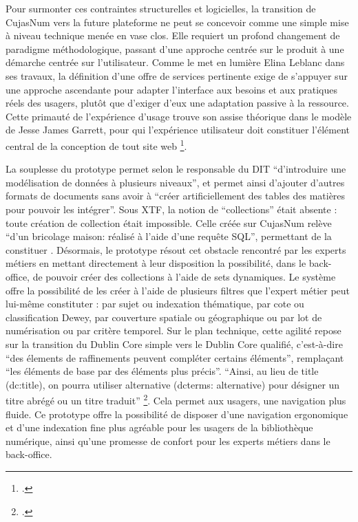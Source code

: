 Pour surmonter ces contraintes structurelles et logicielles, la transition de CujasNum vers la future plateforme ne peut se concevoir comme une simple mise à niveau technique menée en vase clos. Elle requiert un profond changement de paradigme méthodologique, passant d'une approche centrée sur le produit à une démarche centrée sur l'utilisateur. Comme le met en lumière Elina Leblanc dans ses travaux, la définition d'une offre de services pertinente exige de s'appuyer sur une approche ascendante pour adapter l'interface aux besoins et aux pratiques réels des usagers, plutôt que d'exiger d'eux une adaptation passive à la ressource. Cette primauté de l'expérience d'usage trouve son assise théorique dans le modèle de Jesse James Garrett, pour qui l'expérience utilisateur doit constituer l'élément central de la conception de tout site web \footcite{leblancBibliothequesNumeriquesEnrichies}. 

La souplesse du prototype permet selon le responsable du \ac{DIT} \enquote{d'introduire une modélisation de données à plusieurs niveaux}, et permet ainsi d'ajouter d'autres formats de documents sans avoir à \enquote{créer artificiellement des tables des matières pour pouvoir les intégrer}. Sous \ac{XTF}, la notion de \enquote{collections} était absente : toute création de collection était impossible. Celle créée sur CujasNum relève \enquote{d'un bricolage maison: réalisé à l'aide d'une requête \ac{SQL}}, permettant de la constituer . Désormais, le prototype résout cet obstacle rencontré par les experts métiers en mettant directement à leur disposition la possibilité, dans le back-office, de pouvoir créer des collections à l'aide de sets dynamiques. Le système offre la possibilité de les créer à l'aide de plusieurs filtres que l'expert métier peut lui-même constituter : par sujet ou indexation thématique, par cote ou classification Dewey, par couverture spatiale ou géographique ou par lot de numérisation ou par critère temporel. Sur le plan technique, cette agilité repose sur la transition du Dublin Core simple vers le Dublin Core qualifié, c'est-à-dire \enquote{des élements de raffinements peuvent compléter certains éléments}, remplaçant \enquote{les éléments de base par des éléments plus précis}. \enquote{Ainsi, au lieu de title (dc:title), on pourra utiliser alternative (dcterms: alternative) pour désigner un titre abrégé ou un titre traduit} \footcite{lavennedelamontoiseOAIPMHPMHLheure2020}. Cela permet aux usagers, une navigation plus fluide. Ce prototype offre la possibilité de disposer d'une navigation ergonomique et d'une indexation fine plus agréable pour les usagers de la bibliothèque numérique, ainsi qu'une promesse de confort pour les experts métiers dans le back-office.

